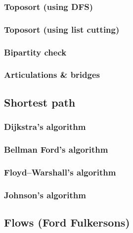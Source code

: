 \documentclass[a4paper]{article}
\begin{document}
\begin{multicols*}{2}
        \subsubsection{Toposort (using DFS)}
            
        \subsubsection{Toposort (using list cutting)}
            
        \subsubsection{Bipartity check}
            
        \subsubsection{Articulations \& bridges}
            

    \subsection{Shortest path}
        \subsubsection{Dijkstra's algorithm}
            
        \subsubsection{Bellman Ford's algorithm}
            
        \subsubsection{Floyd--Warshall's algorithm}
            
        \subsubsection{Johnson's algorithm}
            
    
    \subsection{Flows (Ford Fulkersons)}

\end{multicols*}
\end{document}
